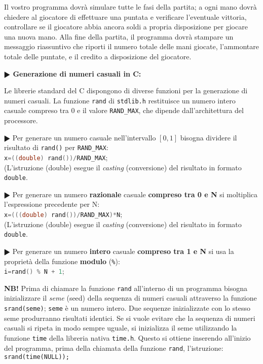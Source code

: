 \documentclass[11pt]{article}
\begin{document}
Il vostro programma dovr\`a simulare tutte le fasi della partita; a ogni mano dovr\`a chiedere al giocatore di effettuare una puntata e verificare l'eventuale vittoria, controllare se il giocatore abbia ancora soldi a propria disposizione per giocare una nuova mano. Alla fine della partita, il programma dovr\`a stampare un messaggio riassuntivo che riporti il numero totale delle mani giocate, l'ammontare totale delle puntate, e il credito a disposizione del giocatore.



\vspace{4mm}

\begin{mdframed}[backgroundcolor=panna]
\textbf{$\RHD$ Generazione di numeri casuali in C:}

Le librerie standard del C dispongono di diverse funzioni per la generazione di numeri casuali.
La funzione \texttt{rand} di \texttt{stdlib.h} restituisce un numero intero casuale compreso tra 0 e il valore \texttt{RAND\_MAX}, che dipende dall'architettura del processore.

\textbf{$\RHD$} Per generare un numero casuale nell'intervallo $ [0,1] $ 
bisogna dividere il risultato di \texttt{rand()} per
\texttt{RAND\_MAX}:
\\
\lstinline[language=c]{x=((double) rand())/RAND_MAX};
\\
(L'istruzione (double) esegue il {\em casting} (conversione) del risultato in formato \texttt{double}.

\textbf{$\RHD$} Per generare un numero {\bf razionale} casuale {\bf compreso tra 0 e N} si moltiplica l'espressione precedente per N:
\\
\lstinline[language=c]{x=(((double) rand())/RAND_MAX)*N};
\\
(L'istruzione (double) esegue il {\em casting} (conversione) del risultato in formato \texttt{double}.

\textbf{$\RHD$} Per generare un numero {\bf intero} casuale {\bf compreso tra 1 e N} si usa la propriet\`a della funzione
{\bf modulo} (\texttt{\%}):
\\
\lstinline[language=c]{i=rand() % N + 1};

{\bf NB!} Prima di chiamare la funzione \texttt{rand} all'interno di un programma bisogna inizializzare il {\em seme} (seed) della sequenza di numeri casuali attraverso la funzione \texttt{srand(seme)}; \texttt{seme} \`e un numero intero. Due sequenze inizializzate con lo stesso seme produrranno risultati identici. Se si vuole evitare che la sequenza di numeri casuali si ripeta in modo sempre uguale, si inizializza il seme utilizzando la funzione \texttt{time} della libreria
nativa \texttt{time.h}. Questo si ottiene inserendo all'inizio del programma, prima della chiamata della funzione \texttt{rand}, l'istruzione:
\\
\texttt{srand(time(NULL));}
\\
\end{mdframed}
\end{document}
